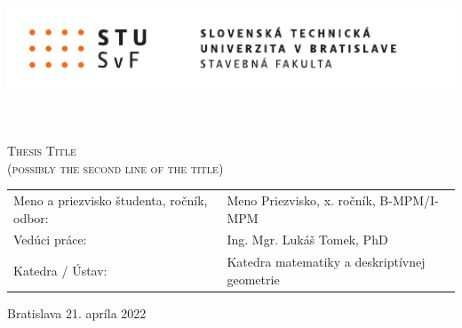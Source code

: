 \thispagestyle{empty}

\begin{center}%
	\includegraphics[height=2.8cm]{figures/STU-SvF-nfh}
\end{center}
\vspace{1cm}

\begin{flushright}
	\\
\end{flushright}
\vspace{3cm}

\begin{center}
	\textsc{\LARGE Thesis Title}\\
	\vspace{2pt}
	\textsc{\LARGE (possibly the second line of the title)}
\end{center}
\vfill

\noindent
\begin{tabular}{ll}
	Meno a priezvisko študenta, ročník, odbor: & Meno Priezvisko, x. ročník, B-MPM/I-MPM\\
	Vedúci práce: & Ing. Mgr. Lukáš Tomek, PhD\\
	Katedra / Ústav: & Katedra matematiky a deskriptívnej geometrie
\end{tabular}
\vspace{3cm}

\begin{center}
	\Large Bratislava 21. apríla 2022 %
\end{center}
\restoregeometry
\newpage

\

